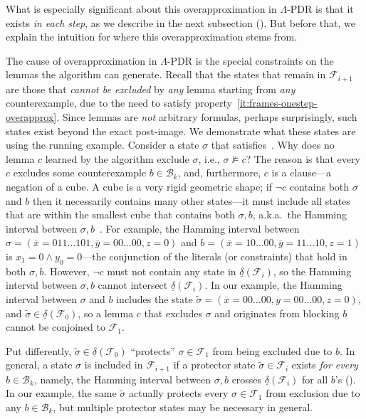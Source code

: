 \documentclass[acmsmall,screen]{acmart}
\newcommand{\ov}{\overline}
\newcommand{\tr}{\delta}
\newcommand{\Frame}{\mathcal{F}}
\renewcommand{\vec}{\ov}
\newcommand{\reflextr}[1]{\underline{#1}}
\newcommand{\postimage}[2]{{\reflextr{#1}}({#2})}
\newcommand{\bkwrch}[1]{\mathcal{B}_{#1}}
\begin{document}
What is especially significant about this overapproximation in $\Lambda$-PDR is that it exists \emph{in each step}, as we describe in the next subsection (). But before that, we explain the intuition for where this overapproximation stems from.

The cause of overapproximation in $\Lambda$-PDR is the special constraints on the lemmas the algorithm can generate.
%
Recall that the states that remain in $\Frame_{i+1}$ are those that \emph{cannot be excluded} by \emph{any} lemma starting from \emph{any} counterexample, due to the need to satisfy property~\ref{it:frames-onestep-overapprox}.
%
Since lemmas are \emph{not} arbitrary formulas, perhaps surprisingly, such states exist beyond the exact post-image.
We demonstrate what these states are using the running example.
Consider a state $\sigma$ that satisfies~.
Why does no lemma $c$ learned by the algorithm exclude $\sigma$, i.e., $\sigma \not\models c$? The reason is that every $c$ excludes some counterexample $b \in \bkwrch{k}$, and, furthermore, $c$ is a clause---a negation of a cube. A cube is a very rigid geometric shape; if $\neg c$ contains both $\sigma$ and $b$ then it necessarily contains many other states---it must include all states that are within the smallest cube that contains both $\sigma,b$, a.k.a.\ the Hamming interval between $\sigma,b$~\cite[e.g.][]{wiedemann1987hamming}.
For example, the Hamming interval between $\sigma = (\vec{x}=011\ldots101,\vec{y}=00\ldots00,z=0)$ and $b = (\vec{x}=10\ldots00,\vec{y}=11\ldots10,z=1)$ is $x_1=0 \land y_0=0$---the conjunction of the literals (or constraints) that hold in both $\sigma,b$.
However, $\neg c$ must not contain any state in $\postimage{\tr}{\Frame_i}$, so the Hamming interval between $\sigma,b$ cannot intersect $\postimage{\tr}{\Frame_i}$.
In our example, the Hamming interval between $\sigma$ and $b$ includes the state $\widetilde{\sigma}=(\vec{x}=00\ldots00, \vec{y}=00\ldots00, z=0)$, and $\widetilde{\sigma} \in \postimage{\tr}{\Frame_0}$, so a lemma $c$ that excludes $\sigma$ and originates from blocking $b$ cannot be conjoined to $\Frame_1$.
%
%
%
%
%
%

Put differently, $\widetilde{\sigma} \in \postimage{\tr}{\Frame_0}$ ``protects'' $\sigma \in \Frame_{1}$ from being excluded due to $b$.
%
%
%
In general, a state $\sigma$ is included in $\Frame_{i+1}$ if a protector state $\widetilde{\sigma} \in \Frame_i$ exists \emph{for every} $b \in \bkwrch{k}$, namely, the Hamming interval between $\sigma,b$ crosses $\postimage{\tr}{\Frame_i}$ for all $b$'s (). In our example, the same $\widetilde{\sigma}$ actually protects every $\sigma \in \Frame_1$ from exclusion due to any $b \in \bkwrch{k}$, but multiple protector states may be necessary in general.
%
%
%
\end{document}
